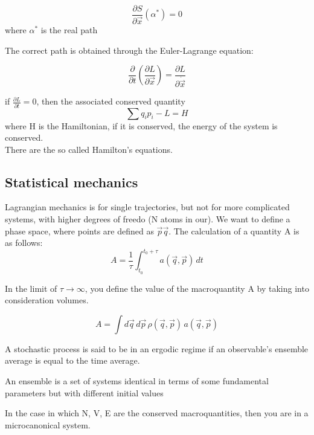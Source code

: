 $$
\frac{\partial S}{\partial \vec{x}}(\alpha^*) = 0
$$
where $\alpha^*$ is the real path

The correct path is obtained through the Euler-Lagrange equation:

\begin{equation}
    \frac{\partial}{\partial t} \left(\frac{\partial L}{\partial \vec{x}}\right) = \frac{\partial L}{\partial \dot{\vec{x}}}
\end{equation}

if $\frac{\partial L}{\partial t} = 0$, then the associated conserved quantity
$$
\sum{q_i p_i} - L = H
$$
where H is the Hamiltonian, if it is conserved, the energy of the system is conserved.\\
There are the so called Hamilton's equations.

\subsection{Statistical mechanics}
Lagrangian mechanics is for single trajectories, but not for more complicated systems, with higher degrees of freedo (N atoms in our).
We want to define a phase space, where points are defined as $\vec{p} \vec{q}$. The calculation of a quantity A is as follows:
$$
A = \frac{1}{\tau} \int_{t_0}^{t_0+\tau} a(\vec{q}, \vec{p}) \, dt
$$

In the limit of $\tau \rightarrow \infty$, you define the value of the macroquantity A by taking into consideration volumes.

$$
A = \int d\vec{q} \, d\vec{p} \, \rho(\vec{q}, \vec{p}) \, a(\vec{q}, \vec{p})
$$

\begin{definition}
    A stochastic process is said to be in an ergodic regime if an observable's ensemble average is equal to the time average.
\end{definition}

An ensemble is a set of systems identical in terms of some fundamental parameters but with different initial values

In the case in which N, V, E are the conserved macroquantities, then you are in a microcanonical system.
